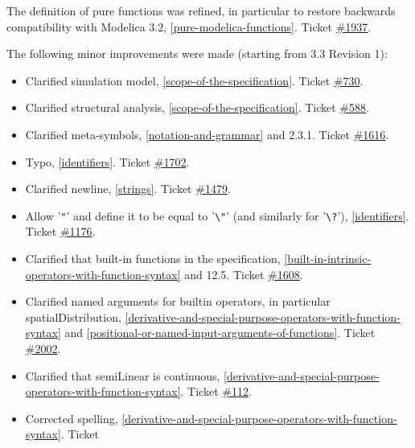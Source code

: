 The definition of pure functions was refined, in particular to restore
backwards compatibility with Modelica 3.2, \autoref{pure-modelica-functions}. Ticket
\href{https://github.com/modelica/ModelicaSpecification/issues/1937}{\#1937}.

The following minor improvements were made (starting from 3.3 Revision 1):

\begin{itemize}
\item
  Clarified simulation model, \autoref{scope-of-the-specification}. Ticket
  \href{https://github.com/modelica/ModelicaSpecification/issues/730}{\#730}.
\item
  Clarified structural analysis, \autoref{scope-of-the-specification}. Ticket
  \href{https://github.com/modelica/ModelicaSpecification/issues/588}{\#588}.
\item
  Clarified meta-symbols, \autoref{notation-and-grammar} and 2.3.1. Ticket
  \href{https://github.com/modelica/ModelicaSpecification/issues/1616}{\#1616}.
\item
  Typo, \autoref{identifiers}. Ticket
  \href{https://github.com/modelica/ModelicaSpecification/issues/1702}{\#1702}.
\item
  Clarified newline, \autoref{strings}. Ticket
  \href{https://github.com/modelica/ModelicaSpecification/issues/1479}{\#1479}.
\item
  Allow '\lstinline!"!' and define it to be equal to '\lstinline!\"!' (and
  similarly for '\lstinline!\?!'), \autoref{identifiers}. Ticket
  \href{https://github.com/modelica/ModelicaSpecification/issues/1176}{\#1176}.
\item
  Clarified that built-in functions in the specification, \autoref{built-in-intrinsic-operators-with-function-syntax}
  and 12.5. Ticket
  \href{https://github.com/modelica/ModelicaSpecification/issues/1608}{\#1608}.
\item
  Clarified named arguments for builtin operators, in particular
  spatialDistribution, \autoref{derivative-and-special-purpose-operators-with-function-syntax} and \autoref{positional-or-named-input-arguments-of-functions}. Ticket
  \href{https://github.com/modelica/ModelicaSpecification/issues/2002}{\#2002}.
\item
  Clarified that semiLinear is continuous, \autoref{derivative-and-special-purpose-operators-with-function-syntax}. Ticket
  \href{https://github.com/modelica/ModelicaSpecification/issues/112}{\#112}.
\item
  Corrected spelling, \autoref{derivative-and-special-purpose-operators-with-function-syntax}. Ticket

\end{itemize}
